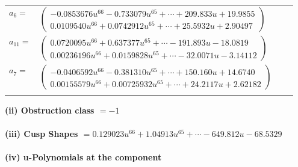 \documentclass[1p]{elsarticle_modified}
\theoremstyle{definition}
\begin{document}
\begin{tabular}{m{7pt} m{180pt} m{7pt} m{180pt} }
\flushright $a_{6}=$&$\begin{pmatrix}-0.0853676 u^{66}-0.733079 u^{65}+\cdots+209.833 u+19.9855\\0.0109540 u^{66}+0.0742912 u^{65}+\cdots+25.5932 u+2.90497\end{pmatrix}$ \\
\flushright $a_{11}=$&$\begin{pmatrix}0.0720095 u^{66}+0.637377 u^{65}+\cdots-191.893 u-18.0819\\0.00236196 u^{66}+0.0159828 u^{65}+\cdots-32.0071 u-3.14112\end{pmatrix}$ \\
\flushright $a_{7}=$&$\begin{pmatrix}-0.0406592 u^{66}-0.381310 u^{65}+\cdots+150.160 u+14.6740\\0.00155579 u^{66}+0.00725932 u^{65}+\cdots+24.2117 u+2.62182\end{pmatrix}$\\&\end{tabular}
\flushleft \textbf{(ii) Obstruction class $= -1$}\\~\\
\flushleft \textbf{(iii) Cusp Shapes $= 0.129023 u^{66}+1.04913 u^{65}+\cdots-649.812 u-68.5329$}\\~\\
\newpage\renewcommand{\arraystretch}{1}
\flushleft \textbf{(iv) u-Polynomials at the component}\newline \\
\end{document}
